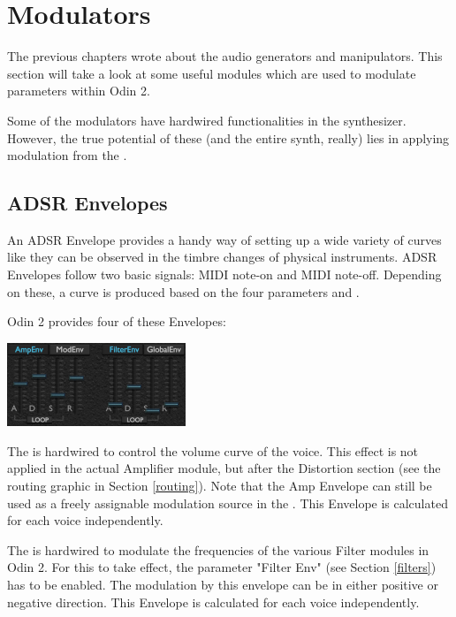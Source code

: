 \chapter{Modulators}
The previous chapters wrote about the audio generators and manipulators. This section will take a look at some useful modules which are used to modulate parameters within Odin 2.

Some of the modulators have hardwired functionalities in the synthesizer. However, the true potential of these (and the entire synth, really) lies in applying modulation from the \modmatrix.

\section{ADSR Envelopes}
\label{ADSR}
An ADSR Envelope provides a handy way of setting up a wide variety of curves like they can be observed in the timbre changes of physical instruments. ADSR Envelopes follow two basic signals: MIDI note-on and MIDI note-off. Depending on these, a curve is produced based on the four parameters  and .

Odin 2 provides four of these Envelopes:

\begin{center}
    \includegraphics[width=0.4\textwidth]{graphics/ADSR_section.png}
\end{center}

The  is hardwired to control the volume curve of the voice. This effect is not applied in the actual Amplifier module, but after the Distortion section (see the routing graphic in Section \ref{routing}). Note that the Amp Envelope can still be used as a freely assignable modulation source in the \modmatrix. This Envelope is calculated for each voice independently.
\label{amp_env}

The  is hardwired to modulate the frequencies of the various Filter modules in Odin 2. For this to take effect, the parameter "Filter Env" (see Section \ref{filters}) has to be enabled. The modulation by this envelope can be in either positive or negative direction. This Envelope is calculated for each voice independently.

